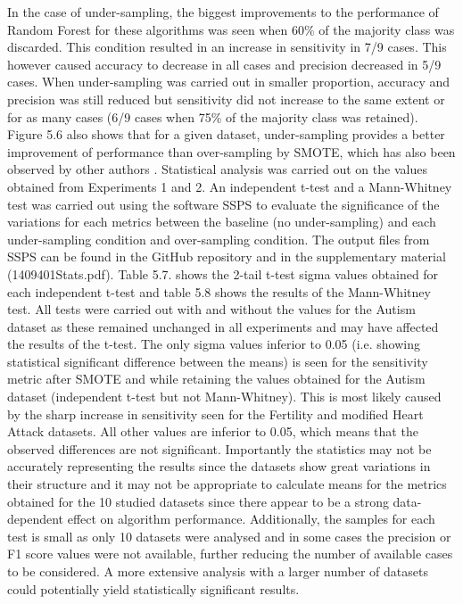 In the case of under-sampling, the biggest improvements to the performance of Random Forest for these algorithms was seen when 60\% of the majority class was discarded. This condition resulted in an increase in sensitivity in 7/9 cases. This however caused accuracy to decrease in all cases and precision decreased in 5/9 cases. When under-sampling was carried out in smaller proportion, accuracy and precision was still reduced but sensitivity did not increase to the same extent or for as many cases (6/9 cases when 75\% of the majority class was retained).\newline
Figure 5.6 also shows that for a given dataset, under-sampling provides a better improvement of performance than over-sampling by SMOTE, which has also been observed by other authors \citep{Rekha:2019uu}.\newline
Statistical analysis was carried out on the values obtained from Experiments 1 and 2. An independent t-test and a Mann-Whitney test was carried out using the software SSPS to evaluate the significance of the variations for each metrics between the baseline (no under-sampling) and each under-sampling condition and over-sampling condition.\newline
The output files from SSPS can be found in the GitHub repository and in the supplementary material (1409401Stats.pdf). Table 5.7. shows the 2-tail t-test sigma values obtained for each independent t-test and table 5.8 shows the results of the Mann-Whitney test. All tests were carried out with and without the values for the Autism dataset as these remained unchanged in all experiments and may have affected the results of the t-test.\newline
The only sigma values inferior to 0.05 (i.e. showing statistical significant difference between the means) is seen for the sensitivity metric after SMOTE and while retaining the values obtained for the Autism dataset (independent t-test but not Mann-Whitney). This is most likely caused by the sharp increase in sensitivity seen for the Fertility and modified Heart Attack datasets.\newline
All other values are inferior to 0.05, which means that the observed differences are not significant. Importantly the statistics may not be accurately representing the results since the datasets show great variations in their structure and it may not be appropriate to calculate means for the metrics obtained for the 10 studied datasets since there appear to be a strong data-dependent effect on algorithm performance. Additionally, the samples for each test is small as only 10 datasets were analysed and in some cases the precision or F1 score values were not available, further reducing the number of available cases to be considered. A more extensive analysis with a larger number of datasets could potentially yield statistically significant results.\newline

